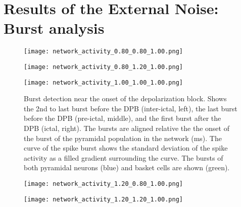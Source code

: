 \section{Results of the External Noise: Burst analysis}
\begin{figure}[!htb]
    \centering
    \texttt{[image: network\_activity\_0.80\_0.80\_1.00.png]}
    \vspace{1em} %

    \texttt{[image: network\_activity\_0.80\_1.20\_1.00.png]}
    \vspace{1em} %

    \texttt{[image: network\_activity\_1.00\_1.00\_1.00.png]}

    \caption{Burst detection near the onset of the depolarization block. 
    Shows the 2nd to last burst before the DPB (inter-ictal, left), the last burst before the DPB (pre-ictal, middle), and the first burst after the DPB (ictal, right).
    The bursts are aligned relative the the onset of the burst of the pyramidal population in the network (ms). 
    The curve of the spike burst shows the standard deviation of the spike activity as a filled gradient surrounding the curve. 
    The bursts of both pyramidal neurons (blue) and basket cells are shown (green).}\label{fig:burst_detection}
\end{figure}

\clearpage %

\begin{figure}[!htb] \ContinuedFloat%
    \centering
    \texttt{[image: network\_activity\_1.20\_0.80\_1.00.png]}
    \vspace{1em} %

    \texttt{[image: network\_activity\_1.20\_1.20\_1.00.png]}

\end{figure}

